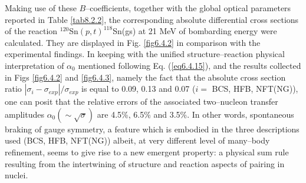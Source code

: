 Making use of these $B$--coefficients, together with the global optical parameters reported in Table \ref{tab8.2.2}, the corresponding absolute differential cross sections of the reaction $^{120}$Sn$(p,t)^{118}$Sn(gs) at 21 MeV of bombarding energy were calculated. They are displayed in Fig. \ref{fig6.4.2} in comparison with the experimental findings. In keeping with the unified structure--reaction physical interpretation of $\alpha_0$ mentioned following Eq. (\ref{eq6.4.15}), and 
the results collected in Figs \ref{fig6.4.2} and \ref{fig6.4.3}, namely the fact that the absolute cross section ratio $|\sigma_i-\sigma_{exp}|/\sigma_{exp}$ is equal to 0.09, 0.13 and 0.07 ($i=$ BCS, HFB, NFT(NG)), one can posit that the relative errors of the associated two--nucleon transfer amplitudes $\alpha_0(\sim\sqrt{\sigma})$ are 4.5\%, 6.5\% and 3.5\%. In other words, spontaneous braking of gauge symmetry, a feature which is embodied in the three descriptions used (BCS, HFB, NFT(NG)) albeit, at very different level of many--body refinement, seems to give rise to a new emergent property: a physical sum rule resulting from the intertwining of structure and reaction aspects of pairing in nuclei. 

